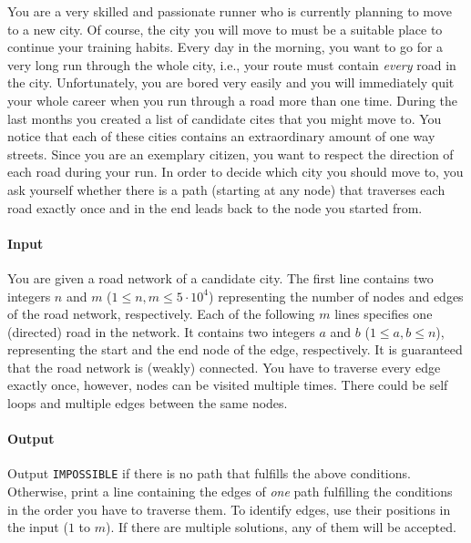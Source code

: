 




You are a very skilled and passionate runner who is currently planning to move to a new city. Of course, the city you will move to must be a suitable place to continue your training habits. 
Every day in the morning, you want to go for a very long run through the whole city, i.e., your route must contain \emph{every} road in the city. Unfortunately, you are bored very easily and you will immediately quit your whole career when you run through a road 
more than one time. During the last months you created a list of candidate cites that you might move to. You notice that each of these cities contains an extraordinary amount of one way streets. Since you are an exemplary citizen, you want to respect the direction 
of each road during your run. In order to decide which city you should move to, you ask yourself whether there is a path (starting at any node) that traverses each road exactly once and in the end leads back to the node you started from.

\paragraph*{Input} You are given a road network of a candidate city. The first line contains two integers $n$ and $m$ ($1 \le n, m \le 5\cdot10^4$) representing the number of nodes and edges of the road network, respectively.
Each of the following $m$ lines specifies one (directed) road in the network. It contains two integers $a$ and $b$ ($1 \le a, b \le n$), representing the start and the end node of the edge, respectively. It is guaranteed that the road network is (weakly) connected.
You have to traverse every edge exactly once, however, nodes can be visited multiple times. There could be self loops and multiple edges between the same nodes.

\paragraph*{Output}

Output \texttt{IMPOSSIBLE} if there is no path that fulfills the above conditions. Otherwise, print a line containing the edges of \emph{one} path fulfilling the conditions in the order you have to traverse them. To identify edges, use their positions in the input ($1$ to $m$). If there are multiple solutions, any of them will be accepted.

\begin{samples}
\end{samples}

